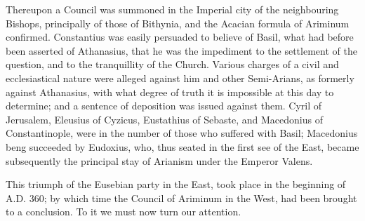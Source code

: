 Thereupon a Council was summoned in the Imperial city of the
neighbouring Bishops, principally of those of Bithynia, and the
Acacian formula of Ariminum confirmed. Constantius was easily
persuaded to believe of Basil, what had before been asserted of
Athanasius, that he was the impediment to the settlement of the
question, and to the tranquillity of the Church. Various charges of a
civil and ecclesiastical nature were alleged against him and other
Semi-Arians, as formerly against Athanasius, with what degree of truth
it is impossible at this day to determine; and a sentence of
deposition was issued against them. Cyril of Jerusalem, Eleusius of
Cyzicus, Eustathius of Sebaste, and Macedonius of Constantinople, were
in the number of those who suffered with Basil; Macedonius beng
succeeded by Eudoxius, who, thus seated in the first see of the East,
became subsequently the principal stay of Arianism under the Emperor
Valens.

This triumph of the Eusebian party in the East, took place in the
beginning of A.D. 360; by which time the Council
of Ariminum in the West, had been brought to a conclusion. To it we
must now turn our attention.

